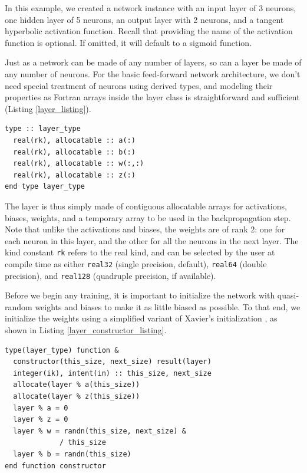 \documentclass[sigplan, review=false, screen=true, balance=true]{acmart}
\begin{document}
In this example, we created a network instance with an input layer of 3 neurons,
one hidden layer of 5 neurons, an output layer with 2 neurons, and a tangent
hyperbolic activation function. Recall that providing the name of the activation
function is optional. If omitted, it will default to a sigmoid function.

Just as a network can be made of any number of layers, so can a layer be made
of any number of neurons. For the basic feed-forward network architecture,
we don't need special treatment of neurons using derived types, and modeling
their properties as Fortran arrays inside the layer class is straightforward
and sufficient (Listing \ref{layer_listing}).

\begin{minipage}{\linewidth}
\begin{lstlisting}[caption={Definition of the layer class.}, captionpos=b, label={layer_listing}]
type :: layer_type
  real(rk), allocatable :: a(:)
  real(rk), allocatable :: b(:)
  real(rk), allocatable :: w(:,:)
  real(rk), allocatable :: z(:)
end type layer_type
\end{lstlisting}
\end{minipage}

The layer is thus simply made of contiguous allocatable arrays for activations,
biases, weights, and a temporary array to be used in the backpropagation step.
Note that unlike the activations and biases, the weights are of rank 2: one for
each neuron in this layer, and the other for all the neurons in the next layer.
The kind constant \lstinline{rk} refers to the real kind, and can be selected
by the user at compile time as either \lstinline{real32} (single precision,
default), \lstinline{real64} (double precision), and \lstinline{real128}
(quadruple precision, if available).

Before we begin any training, it is important to initialize the network with
quasi-random weights and biases to make it as little biased as possible.
To that end, we initialize the weights using a simplified variant of Xavier's
initialization \citep{glorot10}, as shown in Listing \ref{layer_constructor_listing}.

\begin{minipage}{\linewidth}
\begin{lstlisting}[caption={Layer constructor.}, captionpos=b, label={layer_constructor_listing}]
type(layer_type) function &
  constructor(this_size, next_size) result(layer)
  integer(ik), intent(in) :: this_size, next_size
  allocate(layer % a(this_size))
  allocate(layer % z(this_size))
  layer % a = 0
  layer % z = 0
  layer % w = randn(this_size, next_size) &
             / this_size
  layer % b = randn(this_size)
end function constructor
\end{lstlisting}
\end{minipage}
\end{document}
